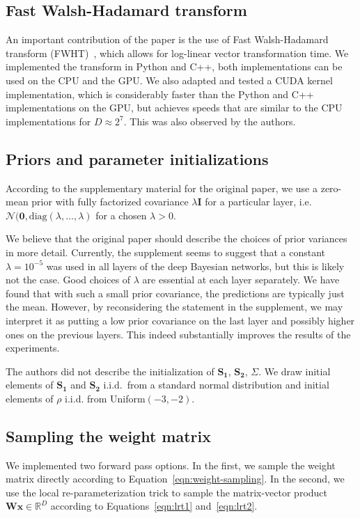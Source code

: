 \documentclass[11pt, twocolumn]{article}
\begin{document}
    \subsection{Fast Walsh-Hadamard transform}
    An important contribution of the paper is the use of Fast Walsh-Hadamard transform (FWHT)~\cite{fino1976unified}, which allows for log-linear vector transformation time.
    We implemented the transform in Python and C++, both implementations can be used on the CPU and the GPU.
    We also adapted and tested a CUDA kernel implementation, which is considerably faster than the Python and C++ implementations on the GPU, but achieves speeds that are similar to the CPU implementations for $D \approx 2^7$.
    This was also observed by the authors.

    \subsection{Priors and parameter initializations}
    According to the supplementary material for the original paper, we use a zero-mean prior with fully factorized covariance $\lambda \mathbf{I}$ for a particular layer, i.e. $\mathcal{N}(\mathbf{0}, \mathrm{diag}(\lambda, \dots, \lambda)$ for a chosen $\lambda > 0$.

    We believe that the original paper should describe the choices of prior variances in more detail.
    Currently, the supplement seems to suggest that a constant $\lambda = 10^{-5}$ was used in all layers of the deep Bayesian networks, but this is likely not the case.
    Good choices of $\lambda$ are essential at each layer separately.
    We have found that with such a small prior covariance, the predictions are typically just the mean.
    However, by reconsidering the statement in the supplement, we may interpret it as putting a low prior covariance on the last layer and possibly higher ones on the previous layers.
    This indeed substantially improves the results of the experiments.

    The authors did not describe the initialization of $\mathbf{S_1}$, $\mathbf{S_2}$, $\Sigma$.
    We draw initial elements of $\mathbf{S_1}$ and $\mathbf{S_2}$ i.i.d.\ from a standard normal distribution and initial elements of $\rho$ i.i.d. from Uniform$(-3, -2)$.

    \subsection{Sampling the weight matrix}\label{subsec:sampling-the-weight-matrix}
    We implemented two forward pass options.
    In the first, we sample the weight matrix directly according to Equation~\ref{eqn:weight-sampling}.
    In the second, we use the local re-parameterization trick to sample the matrix-vector product $\mathbf{W}\mathbf{x} \in \mathbb{R}^D$ according to Equations~\ref{eqn:lrt1} and~\ref{eqn:lrt2}.
\end{document}
